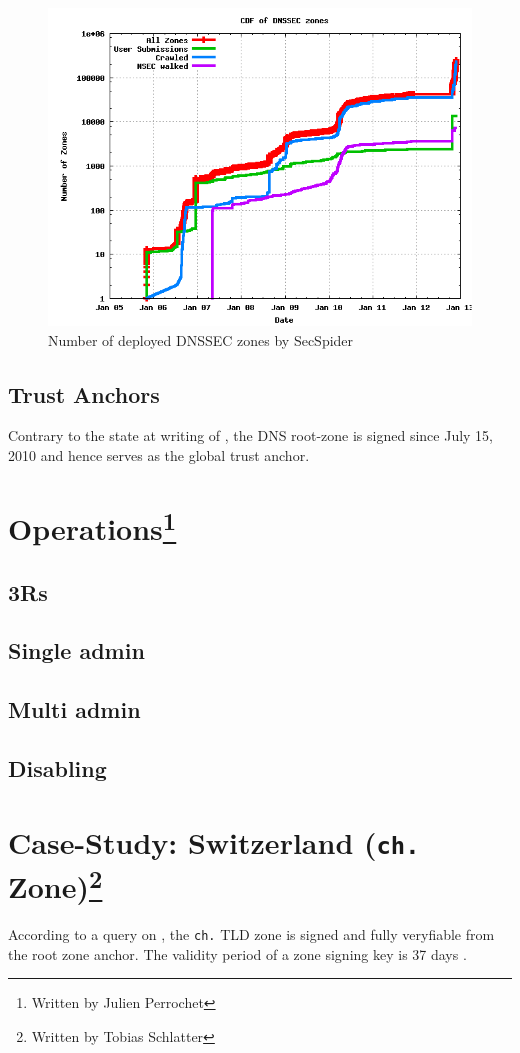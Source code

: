 \documentclass[a4paper]{scrartcl}
\newcommand{\wbjp}{\protect\footnote{Written by Julien Perrochet}}
\newcommand{\wbts}{\protect\footnote{Written by Tobias Schlatter}}
\begin{document}
\begin{figure}
  \includegraphics[width=\linewidth]{dnssec-growth}
  \caption{Number of deployed DNSSEC zones by
    SecSpider \cite{secspider}}
  \label{fig:dnssec-growth}
\end{figure}

\subsection{Trust Anchors}

Contrary to the state at writing of \cite{Osterweil09}, the DNS
root-zone is signed since July 15, 2010 \cite{root-dnssec} and hence
serves as the global trust anchor.


\section{Operations\wbjp}
\subsection{3Rs}
\subsection{Single admin}
\subsection{Multi admin}
\subsection{Disabling}

\section{Case-Study: Switzerland (\texttt{ch.} Zone)\wbts}
According to a query on \cite{secspider}, the \verb|ch.| TLD zone is signed and
fully veryfiable from the root zone anchor. The validity period of a
zone signing key is 37 days \cite{switch10}.

\nocite{*}


\end{document}
